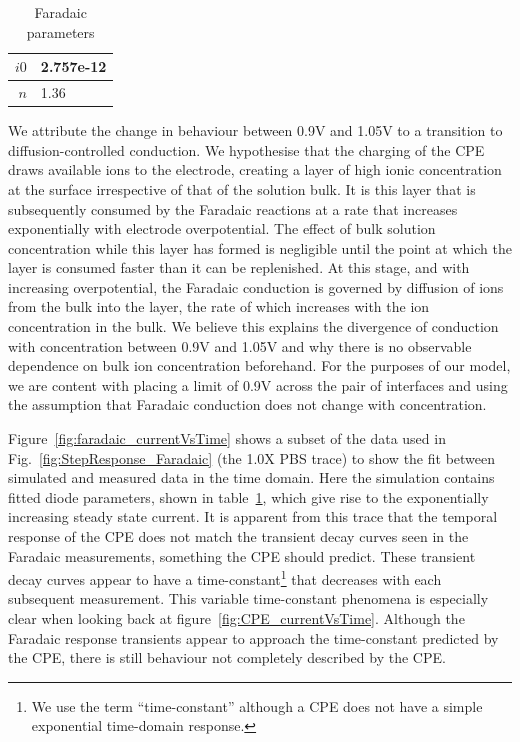 \documentclass[journal, a4paper]{IEEEtran}
\begin{document}
\begin{table}
    \begin{center}
        \begin{tabular}{|r|l|}
            \hline
            $i0$ & 2.757e-12\\ \hline
            $n$ & 1.36\\ \hline
        \end{tabular}
    \end{center}
    \caption{Faradaic parameters}
    \label{tab:FaradaicParams}
\end{table}


We attribute the change in behaviour between 0.9\thinspace V and 1.05\thinspace V to a transition to diffusion-controlled conduction.
We hypothesise that the charging of the CPE draws available ions to the electrode, creating a layer of high ionic concentration at the surface irrespective of that of the solution bulk. It is this layer that is subsequently consumed by the Faradaic reactions at a {\color{blue} rate that increases exponentially with} electrode overpotential.  The effect of bulk solution concentration while this layer has formed is negligible until the point at which the layer is consumed faster than it can be replenished. At this stage, and with increasing overpotential, the Faradaic conduction is governed by diffusion of ions from the bulk into the layer, the rate of which increases with the ion concentration in the bulk. We believe this explains the divergence of conduction with concentration between 0.9\thinspace V and 1.05\thinspace V and why there is no observable dependence on bulk ion concentration beforehand.
For the purposes of our model, we are content with placing a limit of 0.9\thinspace V across the pair of interfaces and using the assumption that Faradaic conduction does not change with concentration.


    Figure~\ref{fig:faradaic_currentVsTime} shows a subset of the data used in Fig.~\ref{fig:StepResponse_Faradaic} (the 1.0X PBS trace) to show the fit between simulated and measured data in the time domain. Here the simulation contains fitted diode parameters, shown in table~\ref{tab:FaradaicParams}, which give rise to the exponentially increasing steady state current.
It is apparent from this trace that the temporal response of the CPE does not match the transient decay curves seen in the Faradaic measurements, something the CPE should predict. These transient decay curves appear to have a time-constant\footnote{We use the term ``time-constant'' although a CPE does not have a simple exponential time-domain response.} that decreases with each subsequent measurement. This variable time-constant phenomena is especially clear when looking back at figure~\ref{fig:CPE_currentVsTime}. Although the Faradaic response transients appear to approach the time-constant predicted by the CPE, there is still behaviour not completely described by the CPE.
\end{document}
